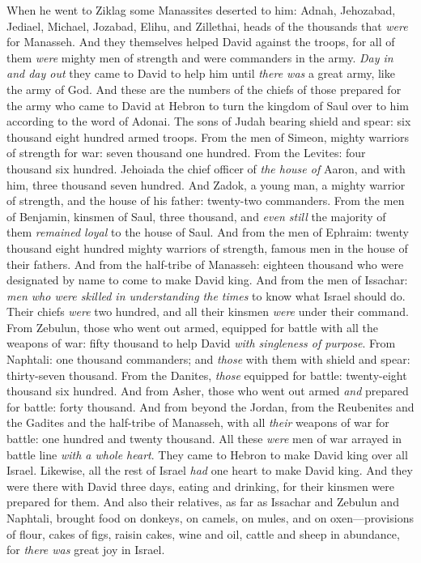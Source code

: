\begin{biblechapter}
\verse When he went to Ziklag some Manassites deserted to him: Adnah, Jehozabad, Jediael, Michael, Jozabad, Elihu, and Zillethai, heads of the thousands that \textit{were} for Manasseh.
\verse And they themselves helped David against the troops, for all of them \textit{were} mighty men of strength and were commanders in the army.
\verse \textit{Day in and day out} they came to David to help him until \textit{there was} a great army, like the army of God.
\verse And these are the numbers of the chiefs of those prepared for the army who came to David at Hebron to turn the kingdom of Saul over to him according to the word of Adonai.
\verse The sons of Judah bearing shield and spear: six thousand eight hundred armed troops.
\verse From the men of Simeon, mighty warriors of strength for war: seven thousand one hundred.
\verse From the Levites: four thousand six hundred.
\verse Jehoiada the chief officer of \textit{the house of} Aaron, and with him, three thousand seven hundred.
\verse And Zadok, a young man, a mighty warrior of strength, and the house of his father: twenty-two commanders.
\verse From the men of Benjamin, kinsmen of Saul, three thousand, and \textit{even still} the majority of them \textit{remained loyal} to the house of Saul.
\verse And from the men of Ephraim: twenty thousand eight hundred mighty warriors of strength, famous men in the house of their fathers.
\verse And from the half-tribe of Manasseh: eighteen thousand who were designated by name to come to make David king.
\verse And from the men of Issachar: \textit{men who were skilled in understanding the times} to know what Israel should do. Their chiefs \textit{were} two hundred, and all their kinsmen \textit{were} under their command.
\verse From Zebulun, those who went out armed, equipped for battle with all the weapons of war: fifty thousand to help David \textit{with singleness of purpose}.
\verse From Naphtali: one thousand commanders; and \textit{those} with them with shield and spear: thirty-seven thousand.
\verse From the Danites, \textit{those} equipped for battle: twenty-eight thousand six hundred.
\verse And from Asher, those who went out armed \textit{and} prepared for battle: forty thousand.
\verse And from beyond the Jordan, from the Reubenites and the Gadites and the half-tribe of Manasseh, with all \textit{their} weapons of war for battle: one hundred and twenty thousand.
\verse All these \textit{were} men of war arrayed in battle line \textit{with a whole heart}. They came to Hebron to make David king over all Israel. Likewise, all the rest of Israel \textit{had} one heart to make David king.
\verse And they were there with David three days, eating and drinking, for their kinsmen were prepared for them.
\verse And also their relatives, as far as Issachar and Zebulun and Naphtali, brought food on donkeys, on camels, on mules, and on oxen—provisions of flour, cakes of figs, raisin cakes, wine and oil, cattle and sheep in abundance, for \textit{there was} great joy in Israel.
\end{biblechapter}

